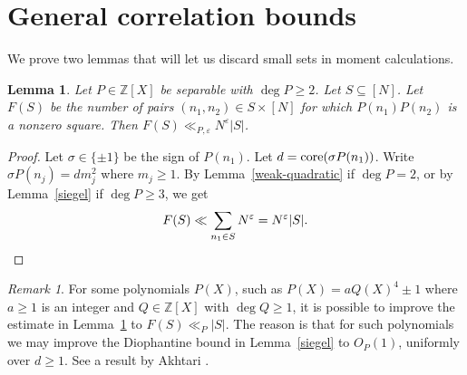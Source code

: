 \documentclass[reqno, 12pt]{amsart}
\theoremstyle{plain}
\newtheorem{lemma}[theorem]{Lemma}
\theoremstyle{definition}
\theoremstyle{remark}
\newtheorem*{remark}{Remark}
\renewcommand{\le}{\leqslant}
\renewcommand{\ge}{\geqslant}
\newcommand{\co}{\textnormal{core}}
\begin{document}
\section{General correlation bounds}

We prove two lemmas that will let us
discard small sets in moment calculations.

\begin{lemma}
\label{mixed-2-correlation}
Let \(P\in \mathbb Z[X]\) be separable with $\deg{P}\ge 2$.
Let $S \subseteq [N]$.
Let $F(S)$ be the number of pairs $(n_1,n_2)\in S \times [N]$
for which $P(n_1)P(n_2)$ is a nonzero square.
Then $F(S) \ll_{P,\varepsilon} N^\varepsilon |S|$.
\end{lemma}

\begin{proof}
Let $\sigma\in \{\pm 1\}$ be the sign of $P(n_1)$.
Let $d = \co(\sigma P(n_1))$.
Write $\sigma P(n_j) = dm_j^2$ where $m_j\ge 1$.
By Lemma~\ref{weak-quadratic} if $\deg{P}=2$,
or by Lemma~\ref{siegel} if $\deg{P}\ge 3$, we get
\begin{equation*}
F(S)
\ll \sum_{n_1\in S} N^\varepsilon
= N^\varepsilon |S|. \qedhere
\end{equation*}
\end{proof}

\begin{remark}
For some polynomials $P(X)$,
such as $P(X) = a Q(X)^4 \pm 1$ where $a\ge 1$ is an integer
and $Q\in \mathbb{Z}[X]$ with $\deg{Q}\ge 1$,
it is possible to improve the estimate in Lemma~\ref{mixed-2-correlation} to
$F(S) \ll_P |S|$.
The reason is that for such polynomials we may improve the
Diophantine bound in Lemma~\ref{siegel}
to $O_P(1)$, uniformly over $d\ge 1$.
See a result by Akhtari \cite{Akhtari}.
\end{remark}
\end{document}
